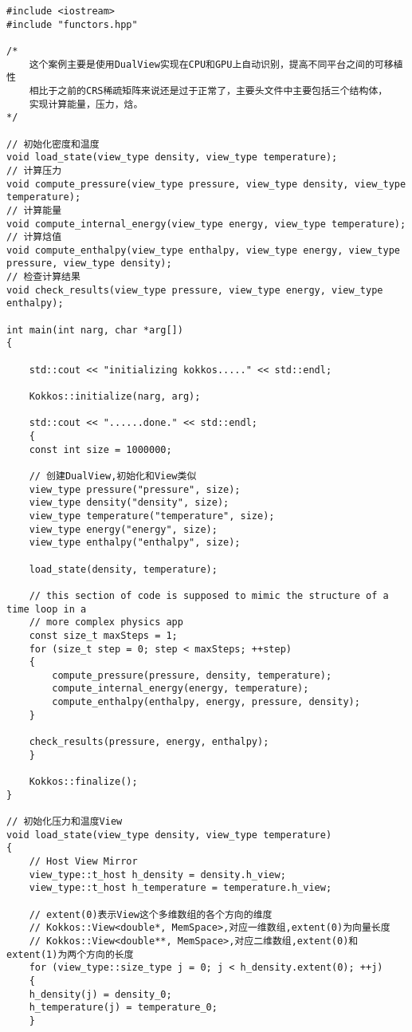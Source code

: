 \begin{lstlisting}
#include <iostream>
#include "functors.hpp"

/*
    这个案例主要是使用DualView实现在CPU和GPU上自动识别，提高不同平台之间的可移植性
    相比于之前的CRS稀疏矩阵来说还是过于正常了，主要头文件中主要包括三个结构体，
    实现计算能量，压力，焓。
*/ 

// 初始化密度和温度
void load_state(view_type density, view_type temperature);
// 计算压力
void compute_pressure(view_type pressure, view_type density, view_type temperature);
// 计算能量
void compute_internal_energy(view_type energy, view_type temperature);
// 计算焓值
void compute_enthalpy(view_type enthalpy, view_type energy, view_type pressure, view_type density);
// 检查计算结果
void check_results(view_type pressure, view_type energy, view_type enthalpy);

int main(int narg, char *arg[])
{

    std::cout << "initializing kokkos....." << std::endl;

    Kokkos::initialize(narg, arg);

    std::cout << "......done." << std::endl;
    {
    const int size = 1000000;
    
    // 创建DualView,初始化和View类似
    view_type pressure("pressure", size);
    view_type density("density", size);
    view_type temperature("temperature", size);
    view_type energy("energy", size);
    view_type enthalpy("enthalpy", size);

    load_state(density, temperature);

    // this section of code is supposed to mimic the structure of a time loop in a
    // more complex physics app
    const size_t maxSteps = 1;
    for (size_t step = 0; step < maxSteps; ++step)
    {
        compute_pressure(pressure, density, temperature);
        compute_internal_energy(energy, temperature);
        compute_enthalpy(enthalpy, energy, pressure, density);
    }

    check_results(pressure, energy, enthalpy);
    }

    Kokkos::finalize();
}

// 初始化压力和温度View
void load_state(view_type density, view_type temperature)
{
    // Host View Mirror
    view_type::t_host h_density = density.h_view;
    view_type::t_host h_temperature = temperature.h_view;

    // extent(0)表示View这个多维数组的各个方向的维度
    // Kokkos::View<double*, MemSpace>,对应一维数组,extent(0)为向量长度
    // Kokkos::View<double**, MemSpace>,对应二维数组,extent(0)和extent(1)为两个方向的长度
    for (view_type::size_type j = 0; j < h_density.extent(0); ++j)
    {
    h_density(j) = density_0;
    h_temperature(j) = temperature_0;
    }


\end{lstlisting}
